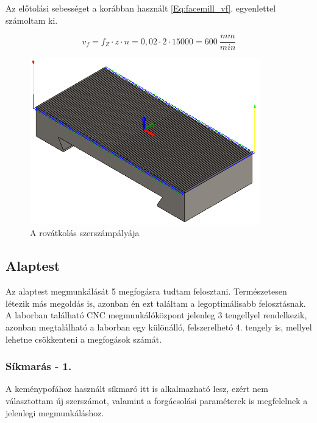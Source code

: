 \documentclass[12pt,a4paper,oneside]{report}
\begin{document}
Az előtolási sebességet a korábban használt \ref{Eq:facemill_vf}. egyenlettel számoltam ki.

\begin{equation*}
    v_f=f_Z\cdot z\cdot n=0,02\cdot 2\cdot 15000=600\ \dfrac{mm}{min}
\end{equation*}

\begin{figure}[H]
    \centering
    \includegraphics[width=10cm]{figures/kemenypofa_engraving.png}
    \caption{A rovátkolás szerszámpályája}
    \label{Fig:kemenypofa_engraving}
\end{figure}

\subsection{Alaptest}
Az alaptest megmunkálását 5 megfogásra tudtam felosztani. Természetesen létezik más megoldás is, azonban én ezt találtam a legoptimálisabb felosztásnak. A laborban található CNC megmunkálóközpont jelenleg 3 tengellyel rendelkezik, azonban megtalálható a laborban egy különálló, felszerelhetó 4. tengely is, mellyel lehetne csökkenteni a megfogások számát.

\subsubsection{Síkmarás - 1.}
A keménypofához használt síkmaró itt is alkalmazható lesz, ezért nem választottam új szerszámot, valamint a forgácsolási paraméterek is megfelelnek a jelenlegi megmunkáláshoz.
\end{document}
